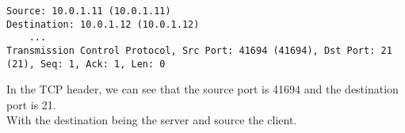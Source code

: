  \begin{lstlisting}
Source: 10.0.1.11 (10.0.1.11)
Destination: 10.0.1.12 (10.0.1.12)
    ...
Transmission Control Protocol, Src Port: 41694 (41694), Dst Port: 21 (21), Seq: 1, Ack: 1, Len: 0
\end{lstlisting}

In the TCP header, we can see that the source port is 41694 and the destination port is 21.\\ With the destination being the server and source the client.\\
